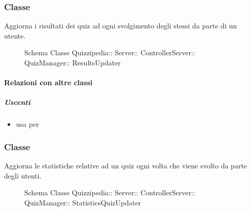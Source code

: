 \subsubsection{Classe }
Aggiorna i risultati dei quiz ad ogni svolgimento degli stessi da parte di un utente.
\begin{figure}[H]
\centering
\noindent{}
\caption[Schema Classe ResultsUpdater]{Schema Classe Quizzipedia:: Server:: ControllerServer:: QuizManager:: ResultsUpdater}
\end{figure}
\paragraph{Relazioni con altre classi}
\subparagraph{Uscenti}
\begin{itemize}
\item usa  per 
\end{itemize}
\subsubsection{Classe }
Aggiorna le statistiche relative ad un quiz ogni volta che viene svolto da parte degli utenti.
\begin{figure}[H]
\centering
\noindent{}
\caption[Schema Classe StatisticsQuizUpdater]{Schema Classe Quizzipedia:: Server:: ControllerServer:: QuizManager:: StatisticsQuizUpdater}
\end{figure}
